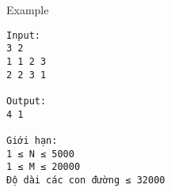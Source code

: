 Example
\begin{verbatim}
Input:
3 2
1 1 2 3
2 2 3 1

Output:
4 1

Giới hạn:
1 ≤ N ≤ 5000
1 ≤ M ≤ 20000
Độ dài các con đường ≤ 32000
\end{verbatim}